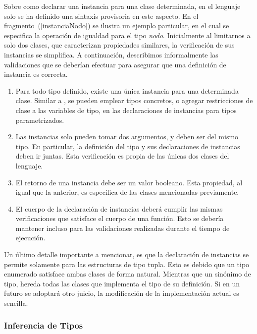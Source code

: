 Sobre como declarar una instancia para una clase determinada, en el lenguaje solo se ha definido una sintaxis provisoria en este aspecto.
En el fragmento~(\ref{instanciaNodo}) se ilustra un ejemplo particular, en el cual se especifica la operación de igualdad para el tipo \textit{nodo}.
Inicialmente al limitarnos a solo dos clases, que caracterizan propiedades similares, la verificación de sus instancias se simplifica.
A continuación, describimos informalmente las validaciones que se deberían efectuar para asegurar que una definición de instancia es correcta.

\begin{enumerate}
    \item Para todo tipo definido, existe una única instancia para una determinada clase.
    Similar a \Haskell{}, se pueden emplear tipos concretos, o agregar restricciones de clase a las variables de tipo, en las declaraciones de instancias para tipos parametrizados.
    \item Las instancias solo pueden tomar dos argumentos, y deben ser del mismo tipo.
    En particular, la definición del tipo y sus declaraciones de instancias deben ir juntas.
    Esta verificación es propia de las únicas dos clases del lenguaje.
    \item El retorno de una instancia debe ser un valor booleano.
    Esta propiedad, al igual que la anterior, es específica de las clases mencionadas previamente.
    \item El cuerpo de la declaración de instancias deberá cumplir las mismas verificaciones que satisface el cuerpo de una función.
    Esto se debería mantener incluso para las validaciones realizadas durante el tiempo de ejecución.
\end{enumerate}

Un último detalle importante a mencionar, es que la declaración de instancias se permite solamente para las estructuras de tipo tupla.
Esto es debido que un tipo enumerado satisface ambas clases de forma natural.
Mientras que un sinónimo de tipo, hereda todas las clases que implementa el tipo de su definición.
Si en un futuro se adoptará otro juicio, la modificación de la implementación actual es sencilla.

\subsubsection{Inferencia de Tipos}

